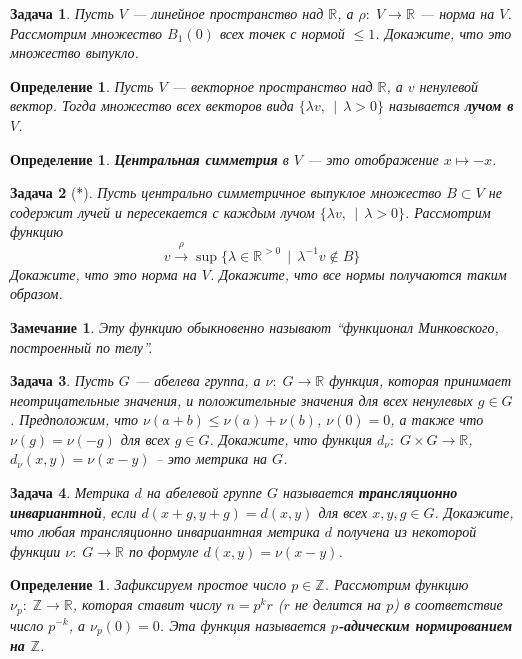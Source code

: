 \documentclass[12pt]{book}
\def\Z{{\mathbb Z}}
\def\R{{\mathbb R}}
\theoremstyle{upshape}
\newtheorem{zadacha}{Задача}[chapter]
\theoremstyle{generic}
\newtheorem{opredelenie}[teorema]{Определение}
\newtheorem{remark}[teorema]{Замечание}
\def\замечание{\begin{remark}}
\def\еза{\end{remark}}
\theoremstyle{upshapenonumber}
\newcommand{\следствие}{%
     \refstepcounter{teorema}
     {\noindent\bf Следствие \thechapter.\arabic{teorema}:\ }}
\newcommand{\пример}{%
     \refstepcounter{teorema}
     {\noindent\bf Пример \thechapter.\arabic{teorema}:\ }}
\newcommand{\лемма}{%
     \refstepcounter{teorema}
     {\noindent\bf Лемма \thechapter.\arabic{teorema}:\ }}
\newcommand{\теорема}{%
     \refstepcounter{teorema}
     {\noindent\bf Теорема \thechapter.\arabic{teorema}:\ }}
\newcommand{\утверждение}{%
     \refstepcounter{teorema}
     {\noindent\bf Утверждение \thechapter.\arabic{teorema}:\ }}
\def\ем{\em}
\def\задача{\begin{zadacha}}
\def\ез{\end{zadacha}}
\def\еу{\end{ukazanie}}
\def\ео{\end{opredelenie}}
\def\енум{\begin{enumerate}}
\def\ее{\end{enumerate}}
\begin{document}
{\begin{zadacha} Пусть $V$ --- линейное пространство
над $\R$, а $\rho:\; V \to \R$ --- норма на $V$. Рассмотрим множество
$B_1(0)$ всех точек с нормой $\leq 1$. Докажите, что это множество
выпукло.
\end{zadacha}

\begin{opredelenie} Пусть $V$ --- векторное пространство
над $\R$, а $v$ ненулевой вектор. Тогда множество всех векторов вида
$\{ \lambda v, \ \ | \ \ \lambda >0\}$ называется {\bf лучом в $V$}.
\end{opredelenie}

\begin{opredelenie} {\bf Центральная симметрия} в $V$ --- это
отображение $x \mapsto -x$.
\end{opredelenie}

\begin{zadacha}[*] Пусть центрально симметричное выпуклое множество
$B\subset V$ не содержит лучей и пересекается с каждым лучом $\{
\lambda v, \ \ | \ \ \lambda >0\}$. Рассмотрим функцию
$$
v \overset{\rho}{\to} \sup\{\lambda \in \R^{>0}\ \ | \ \ \lambda^{-1}
v\notin B\}
$$
Докажите, что это норма на $V$. Докажите, что все нормы получаются
таким образом.
\end{zadacha}

\замечание
Эту функцию обыкновенно
называют ``функционал Минковского, построенный
по телу''.
\еза


\begin{zadacha} Пусть $G$ --- абелева группа, а 
$\nu:\; G \to \R$ функция, которая принимает неотрицательные
значения, и положительные значения для всех ненулевых $g\in G$.
Предположим, что $\nu(a+b) \leq \nu(a) + \nu(b)$, $\nu(0)=0$, а также
что $\nu(g) = \nu(-g)$ для всех $g\in G$.  Докажите, что
функция $d_\nu:\; G \times G \to \R$, $d_\nu(x, y) = \nu (x-y)$ --
это метрика на $G$.
\end{zadacha}

\begin{zadacha} Метрика $d$ на абелевой группе $G$ называется
{\bf трансляционно инвариантной}, если $d(x+g, y+g) = d(x,y)$ для всех $x, y, g
\in G$. Докажите, что любая трансляционно инвариантная метрика $d$ получена из
некоторой функции $\nu:\; G \to \R$ по формуле $d(x, y) = \nu
(x-y)$.
\end{zadacha}

\begin{opredelenie} 
Зафиксируем простое число $p\in \Z$. Рассмотрим функцию $\nu_p:\; \Z
\to \R$, которая ставит числу $n = p^k r$ ($r$ не делится на $p$) в
соответствие число $p^{-k}$, а $\nu_p(0)=0$. Эта функция называется {\bf
$p$-адическим нормированием на $\Z$}.
\end{opredelenie}

}
\end{document}
